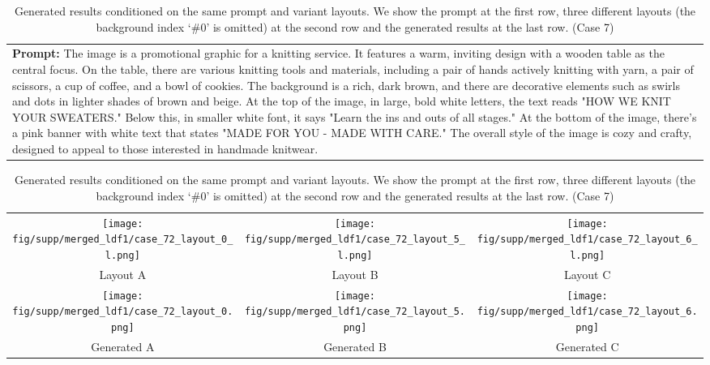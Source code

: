 \begin{table}[htbp]
    \centering
    \begin{tabular}{p{\textwidth}}
    \midrule
    \textbf{Prompt:} \small{The image is a promotional graphic for a knitting service. It features a warm, inviting design with a wooden table as the central focus. On the table, there are various knitting tools and materials, including a pair of hands actively knitting with yarn, a pair of scissors, a cup of coffee, and a bowl of cookies. The background is a rich, dark brown, and there are decorative elements such as swirls and dots in lighter shades of brown and beige. At the top of the image, in large, bold white letters, the text reads "HOW WE KNIT YOUR SWEATERS." Below this, in smaller white font, it says "Learn the ins and outs of all stages." At the bottom of the image, there's a pink banner with white text that states "MADE FOR YOU - MADE WITH CARE." The overall style of the image is cozy and crafty, designed to appeal to those interested in handmade knitwear.}
    \vspace{1em}
    \end{tabular}
    \begin{tabular}{ccc}
        \texttt{[image: fig/supp/merged\_ldf1/case\_72\_layout\_0\_l.png]} &
        \texttt{[image: fig/supp/merged\_ldf1/case\_72\_layout\_5\_l.png]} &
        \texttt{[image: fig/supp/merged\_ldf1/case\_72\_layout\_6\_l.png]} \\
        \small{Layout A} & \small{Layout B} & \small{Layout C} \\[1em]
        \texttt{[image: fig/supp/merged\_ldf1/case\_72\_layout\_0.png]} &
        \texttt{[image: fig/supp/merged\_ldf1/case\_72\_layout\_5.png]} &
        \texttt{[image: fig/supp/merged\_ldf1/case\_72\_layout\_6.png]} \\
        \small{Generated A} & \small{Generated B} & \small{Generated C} \\
        \bottomrule
    \end{tabular}
    
    \caption{Generated results conditioned on the same prompt and variant layouts. We show the prompt at the first row, three different layouts (the background index `\#0' is omitted) at the second row and the generated results at the last row. (Case 7)}
    \label{tab:variant_layout7}
\end{table}

